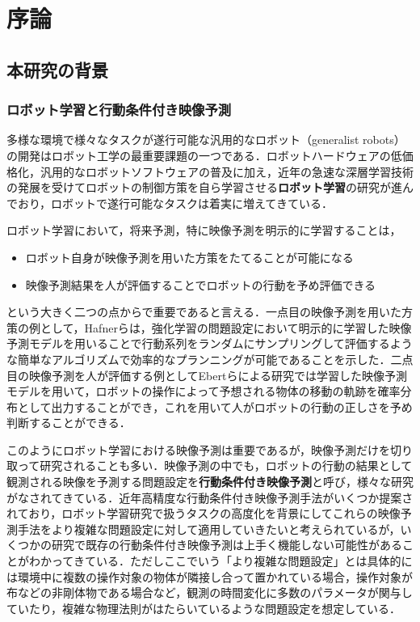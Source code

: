 \chapter{序論}
\label{chap:introduction}
\section{本研究の背景}
\subsection{ロボット学習と行動条件付き映像予測}
多様な環境で様々なタスクが遂行可能な汎用的なロボット（generalist robots）の開発はロボット工学の最重要課題の一つである\cite{escudero2015distance}．ロボットハードウェアの低価格化，汎用的なロボットソフトウェアの普及に加え，近年の急速な深層学習技術の発展を受けてロボットの制御方策を自ら学習させる{\bf ロボット学習}の研究が進んでおり，ロボットで遂行可能なタスクは着実に増えてきている．

ロボット学習において，将来予測，特に映像予測を明示的に学習することは，

\begin{itemize}
    \item ロボット自身が映像予測を用いた方策をたてることが可能になる
    \item 映像予測結果を人が評価することでロボットの行動を予め評価できる
\end{itemize}
という大きく二つの点からで重要であると言える．一点目の映像予測を用いた方策の例として，Hafnerら\cite{hafner2019planet}は，強化学習の問題設定において明示的に学習した映像予測モデルを用いることで行動系列をランダムにサンプリングして評価するような簡単なアルゴリズムで効率的なプランニングが可能であることを示した．二点目の映像予測を人が評価する例としてEbertらによる研究\cite{ebert2018visual}では学習した映像予測モデルを用いて，ロボットの操作によって予想される物体の移動の軌跡を確率分布として出力することができ，これを用いて人がロボットの行動の正しさを予め判断することができる．

このようにロボット学習における映像予測は重要であるが，映像予測だけを切り取って研究されることも多い．映像予測の中でも，ロボットの行動の結果として観測される映像を予測する問題設定を{\bf 行動条件付き映像予測}と呼び\cite{oh2015actionconditional}\cite{finn2016unsupervised}\cite{babaeizadeh2017stochastic}，様々な研究がなされてきている．近年高精度な行動条件付き映像予測手法がいくつか提案されており，ロボット学習研究で扱うタスクの高度化を背景にしてこれらの映像予測手法をより複雑な問題設定に対して適用していきたいと考えられているが，いくつかの研究で既存の行動条件付き映像予測は上手く機能しない可能性があることがわかってきている．ただしここでいう「より複雑な問題設定」とは具体的には環境中に複数の操作対象の物体が隣接し合って置かれている場合，操作対象が布などの非剛体物である場合など，観測の時間変化に多数のパラメータが関与していたり，複雑な物理法則がはたらいているような問題設定を想定している．

